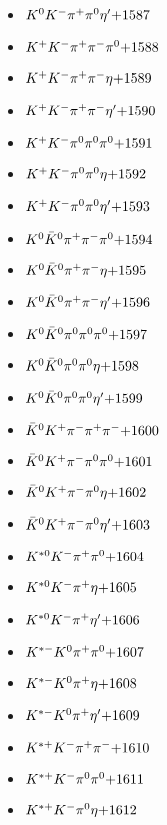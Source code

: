 \begin{multicols}{3}
\begin{itemize}
 \item $ K^{0} K^{-} \pi^{+} \pi^{0} {\eta^{\prime}} \hfill{+1587}$
 \item $ K^{+} K^{-} \pi^{+} \pi^{-} \pi^{0} \hfill{+1588}$
 \item $ K^{+} K^{-} \pi^{+} \pi^{-} \eta \hfill{+1589}$
 \item $ K^{+} K^{-} \pi^{+} \pi^{-} {\eta^{\prime}} \hfill{+1590}$
 \item $ K^{+} K^{-} \pi^{0} \pi^{0} \pi^{0} \hfill{+1591}$
 \item $ K^{+} K^{-} \pi^{0} \pi^{0} \eta \hfill{+1592}$
 \item $ K^{+} K^{-} \pi^{0} \pi^{0} {\eta^{\prime}} \hfill{+1593}$
 \item $ K^{0} \bar{K}^{0} \pi^{+} \pi^{-} \pi^{0} \hfill{+1594}$
 \item $ K^{0} \bar{K}^{0} \pi^{+} \pi^{-} \eta \hfill{+1595}$
 \item $ K^{0} \bar{K}^{0} \pi^{+} \pi^{-} {\eta^{\prime}} \hfill{+1596}$
 \item $ K^{0} \bar{K}^{0} \pi^{0} \pi^{0} \pi^{0} \hfill{+1597}$
 \item $ K^{0} \bar{K}^{0} \pi^{0} \pi^{0} \eta \hfill{+1598}$
 \item $ K^{0} \bar{K}^{0} \pi^{0} \pi^{0} {\eta^{\prime}} \hfill{+1599}$
 \item $ \bar{K}^{0} K^{+} \pi^{-} \pi^{+} \pi^{-} \hfill{+1600}$
 \item $ \bar{K}^{0} K^{+} \pi^{-} \pi^{0} \pi^{0} \hfill{+1601}$
 \item $ \bar{K}^{0} K^{+} \pi^{-} \pi^{0} \eta \hfill{+1602}$
 \item $ \bar{K}^{0} K^{+} \pi^{-} \pi^{0} {\eta^{\prime}} \hfill{+1603}$
 \item $ K^{*0} K^{-} \pi^{+} \pi^{0} \hfill{+1604}$
 \item $ K^{*0} K^{-} \pi^{+} \eta \hfill{+1605}$
 \item $ K^{*0} K^{-} \pi^{+} {\eta^{\prime}} \hfill{+1606}$
 \item $ K^{*-} K^{0} \pi^{+} \pi^{0} \hfill{+1607}$
 \item $ K^{*-} K^{0} \pi^{+} \eta \hfill{+1608}$
 \item $ K^{*-} K^{0} \pi^{+} {\eta^{\prime}} \hfill{+1609}$
 \item $ K^{*+} K^{-} \pi^{+} \pi^{-} \hfill{+1610}$
 \item $ K^{*+} K^{-} \pi^{0} \pi^{0} \hfill{+1611}$
 \item $ K^{*+} K^{-} \pi^{0} \eta \hfill{+1612}$

\end{itemize}
\end{multicols}
